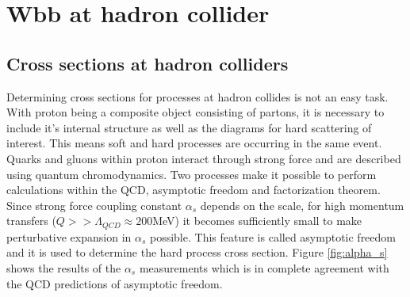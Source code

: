 
\section{Wbb at hadron collider}



\subsection{Cross sections at hadron colliders}

	Determining cross sections for processes at hadron collides is not an easy task. With proton being a composite object consisting of partons, it is necessary to include it's internal structure as well as the diagrams for hard scattering of interest. This means soft and hard processes are occurring in the same event. Quarks and gluons within proton interact through strong force and are described using quantum chromodynamics. Two processes make it possible to perform calculations within the QCD, asymptotic freedom and factorization theorem. Since strong force coupling constant $\alpha_s$ depends on the scale, for high momentum transfers ($Q >> \Lambda_{QCD}\approx 200$MeV) it becomes sufficiently small to make perturbative expansion in $\alpha_s$ possible. This feature is called asymptotic freedom and it is used to determine the hard process cross section. Figure \ref{fig:alpha_s} shows the results of the $\alpha_s$ measurements which is in complete agreement with the QCD predictions of asymptotic freedom. \\
